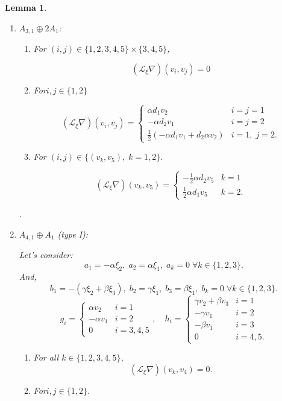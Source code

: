 \documentclass[10pt]{article}
\newtheorem{Lemma}{Lemma}
\begin{document}
\begin{Lemma}
\begin{enumerate}
  \item \(A_{3,1}\oplus2A_1\):\\
\begin{enumerate}
    \item For $(i, j)\in \{1,2,3,4,5\}\times\{3,4,5\}$,

    $$(\mathscr{L}_\xi\nabla)(v_i,v_j)=0$$
    \item For$i,j \in \{1,2\}$
    
    \[
(\mathscr{L}_\xi\nabla)(v_i,v_j) = 
\begin{cases}
	\alpha d_1v_2  & i=j=1 \\
	-\alpha  d_2 v_1 & i=j=2 \\
	\tfrac{1}{2}(-\alpha d_1 v_1 +d_2\alpha v_2) & i=1,\; j=2.
\end{cases}
\]
\item For $(i,j) \in \{(v_k,v_5),\; k=1,2\}.$

    \[
(\mathscr{L}_\xi\nabla)(v_k,v_5) =
\begin{cases}
	-\tfrac{1}{2}\alpha d_2v_5  & k=1 \\
	\tfrac{1}{2}\alpha d_1v_5 & k=2. 
\end{cases}
\]
\end{enumerate}  .

\item  \(A_{4,1}\oplus A_1\) (type I):

Let's consider:
$$a_1=-\alpha\xi_2,\;a_2=\alpha\xi_1,\;a_k=0 \; \forall k\in \{1,2,3\}.$$
And,
$$b_1=-(\gamma\xi_2 + \beta\xi_3) ,\;b_2=\gamma\xi_1,\;b_3=\beta\xi_1,\;b_k=0 \; \forall k\in \{1,2,3\}.$$
\[ g_i=\begin{cases} 
\alpha v_2 &i=1\\ 
-\alpha v_1&i=2\\ 
0 &i=3,4,5 
\end{cases},\quad h_i=\begin{cases} 
\gamma v_2+\beta v_3 &i=1\\ 
-\gamma v_1&i=2\\ 
-\beta v_1&i=3\\ 
0 &i=4,5 .
\end{cases}\]
\begin{enumerate} 
\item For all $k\in\{1,2,3,4,5\}$,
\begin{equation}(\mathscr{L}_\xi\nabla)(v_k,v_4)=0. \end{equation}
\item For$i,j\in \{1,2\}$. 


\end{enumerate}
\end{enumerate}
\end{Lemma}
\end{document}
